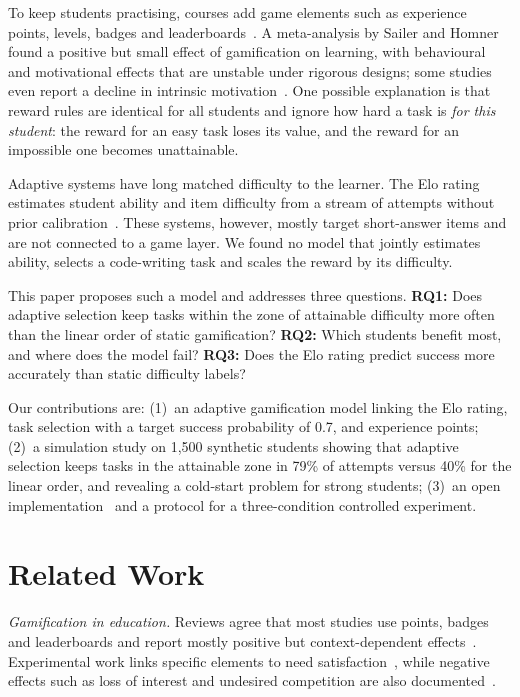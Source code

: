 \documentclass[conference]{IEEEtran}
\begin{document}
To keep students practising, courses add game elements such as experience points, levels, badges and leaderboards~\cite{deterding2011,denny2013,marin2019}. A meta-analysis by Sailer and Homner~\cite{sailer2020} found a positive but small effect of gamification on learning, with behavioural and motivational effects that are unstable under rigorous designs; some studies even report a decline in intrinsic motivation~\cite{hanus2015}. One possible explanation is that reward rules are identical for all students and ignore how hard a task is \emph{for this student}: the reward for an easy task loses its value, and the reward for an impossible one becomes unattainable.

Adaptive systems have long matched difficulty to the learner. The Elo rating estimates student ability and item difficulty from a stream of attempts without prior calibration~\cite{pelanek2016,klinkenberg2011}. These systems, however, mostly target short-answer items and are not connected to a game layer. We found no model that jointly estimates ability, selects a code-writing task and scales the reward by its difficulty.

This paper proposes such a model and addresses three questions. \textbf{RQ1:} Does adaptive selection keep tasks within the zone of attainable difficulty more often than the linear order of static gamification? \textbf{RQ2:} Which students benefit most, and where does the model fail? \textbf{RQ3:} Does the Elo rating predict success more accurately than static difficulty labels?

Our contributions are: (1)~an adaptive gamification model linking the Elo rating, task selection with a target success probability of 0.7, and experience points; (2)~a simulation study on 1,500 synthetic students showing that adaptive selection keeps tasks in the attainable zone in 79\% of attempts versus 40\% for the linear order, and revealing a cold-start problem for strong students; (3)~an open implementation~\cite{nirm2026code} and a protocol for a three-condition controlled experiment.

\section{Related Work}
\textit{Gamification in education.} Reviews agree that most studies use points, badges and leaderboards and report mostly positive but context-dependent effects~\cite{hamari2014,dicheva2015}. Experimental work links specific elements to need satisfaction~\cite{sailer2017}, while negative effects such as loss of interest and undesired competition are also documented~\cite{toda2018}.
\end{document}
